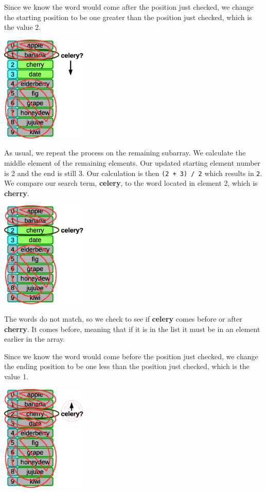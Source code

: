 Since we know the word would come after the position just checked, we change the starting position to be one greater than the position just checked, which is the value 2.

\beforefig
\centerline{\includegraphics[height=2in]{figs2/recursion-binsearch-failure-4.eps}}
\afterfig

As usual, we repeat the process on the remaining subarray. We calculate the middle element of the remaining elements. Our updated starting element number is 2 and the end is still 3. Our calculation is then \texttt{(2 + 3) / 2} which results in \texttt{2}. We compare our search term, \textbf{celery}, to the word located in element 2, which is \textbf{cherry}.

\beforefig
\centerline{\includegraphics[height=2in]{figs2/recursion-binsearch-failure-5.eps}}
\afterfig

The words do not match, so we check to see if \textbf{celery} comes before or after \textbf{cherry}. It comes before, meaning that if it is in the list it must be in an element earlier in the array. 

Since we know the word would come before the position just checked, we change the ending position to be one less than the position just checked, which is the value 1. 

\beforefig
\centerline{\includegraphics[height=2in]{figs2/recursion-binsearch-failure-6.eps}}
\afterfig

